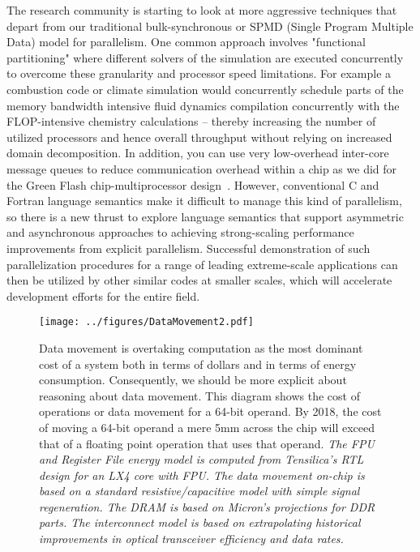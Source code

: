 The research community is starting to look at more aggressive techniques that depart from our traditional bulk-synchronous or SPMD (Single Program Multiple Data) model for parallelism.   One common approach involves "functional partitioning" where different solvers of the simulation are executed concurrently to overcome these granularity and processor speed limitations.   For example a combustion code or climate simulation would concurrently schedule parts of the memory bandwidth intensive fluid dynamics compilation concurrently with the FLOP-intensive chemistry calculations -- thereby increasing the number of utilized processors and hence overall throughput without relying on increased domain decomposition.  In addition, you can use very low-overhead inter-core message queues to reduce communication overhead within a chip as we did for the Green Flash chip-multiprocessor design~\cite{GreenFlash}.  However, conventional C and Fortran language semantics make it difficult to manage this kind of parallelism, so there is a new thrust to explore language semantics that support asymmetric and asynchronous approaches to achieving strong-scaling performance improvements from explicit parallelism.  Successful demonstration of such parallelization procedures for a range of leading extreme-scale applications can then be utilized by other similar codes at smaller scales, which will accelerate development efforts for the entire field.

\begin{figure}\begin{centering}
\texttt{[image: ../figures/DataMovement2.pdf]}
\caption{Data movement is overtaking computation as the most dominant cost of a system both in terms of dollars and in terms of energy consumption.  Consequently, we should be more explicit about reasoning about data movement. This diagram shows the cost of operations or data movement for a 64-bit operand.  By 2018, the cost of moving a 64-bit operand a mere 5mm across the chip will exceed that of a floating point operation that uses that operand. {\em The FPU and Register File energy model is computed from Tensilica's RTL design for an LX4 core with FPU.  The data movement on-chip is based on a standard resistive/capacitive model with simple signal regeneration.  The DRAM is based on Micron's projections for DDR parts.  The interconnect model is based on extrapolating historical improvements in optical transceiver efficiency and data rates.}}
\label{fig:datamovement}
\end{centering}\end{figure}


